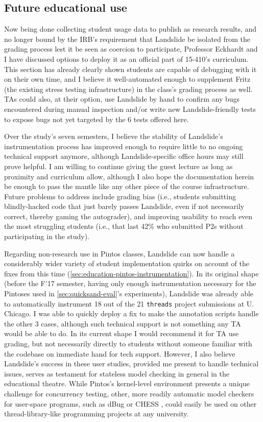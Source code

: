 \subsection{Future educational use}
\label{sec:education-future-use}

Now being done collecting student usage data to publish as research results,
and no longer bound by the IRB's requirement that Landslide be isolated from the grading process
lest it be seen as coercion to participate,
Professor Eckhardt and I have discussed options to deploy it as an official part of 15-410's curriculum.
This section has already clearly shown students are capable of debugging with it on their own time,
and I believe it well-automated enough to supplement Fritz (the existing stress testing infrastructure)
in the class's grading process as well.
TAs could also, at their option, use Landslide by hand to confirm any bugs encountered during manual inspection
and/or write new Landslide-friendly tests to expose bugs not yet targeted by the 6 tests offered here.

Over the study's seven semesters,
I believe the stability of Landslide's instrumentation process has improved enough
to require little to no ongoing technical support anymore,
although Landslide-specific office hours may still prove helpful.
I am willing to continue giving the guest lecture as long as proximity and curriculum allow,
although I also hope the documentation herein be enough to pass the mantle like any other piece of the course infrastructure.
Future problems to address include grading bias
(i.e., students submitting blindly-hacked code that just barely passes Landslide,
even if not necessarily correct,
thereby gaming the autograder),
and improving usability to reach even the most struggling students
(i.e., that last 42\% who submitted P2s without participating in the study).

Regarding non-research use in Pintos classes,
Landslide can now handle a considerably wider variety of student implementation quirks
on account of the fixes from this time (\cref{sec:education-pintos-instrumentation}).
In its original shape
(before the F'17 semester,
having only enough instrumentation necessary for the Pintoses used in \cref{sec:quicksand-eval}'s experiments),
Landslide was already able to automatically instrument 18 out of the 21 {\tt threads} project submissions at U. Chicago.
I was able to quickly deploy a fix to make the annotation scripts handle the other 3 cases,
although such technical support is not something any TA would be able to do.
%
In its current shape I would recommend it for TA use grading,
but not necessarily directly to students without someone familiar with the codebase on immediate hand for tech support.
However, I also believe Landslide's success in these user studies,
provided me present to handle technical issues,
serves as testament for stateless model checking in general in the educational theatre.
While Pintos's kernel-level environment presents a unique challenge for concurrency testing,
other, more readily automatic model checkers for user-space programs,
such as dBug \cite{dbug-ssv} or CHESS \cite{chess},
could easily be used on other thread-library-like programming projects at any university.

